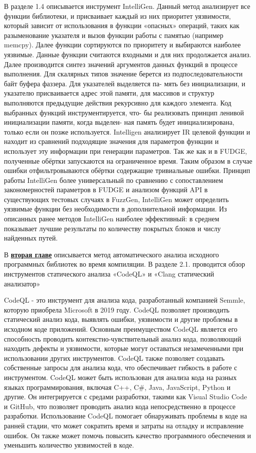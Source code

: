 В разделе 1.4 описывается инструмент IntelliGen. Данный метод анализирует все функции библиотеки, и присваивает каждый из них приоритет уязвимости, который зависит от использования в функции «опасных» операций, таких как разыменование указателя и вызов функции работы с памятью (например memcpy). Далее функции сортируются по приоритету и выбираются наиболее уязвимые. Данные функции считаются входными и для них продолжается анализ. Далее производится синтез значений аргументов данных функций в процессе выполнения. Для скалярных типов значение берется из подпоследовательности байт буфера фаззера. Для указателей выделяется па- мять без инициализации, и указателю присваивается адрес этой памяти, для массивов и структур выполняются предыдущие действия рекурсивно для каждого элемента. Код выбранных функций инструментируется, что- бы реализовать принцип ленивой инициализации памяти, когда выделен- ная память будет инициализирована, только если он позже используется. Intelligen анализирует IR целевой функции и находит из сравнений подходящие значения для параметров функции и использует эту информации при генерации параметров. Так же как и в FUDGE, полученные обёртки запускаются на ограниченное время. Таким образом в случае ошибки отфильтровываются обёртки содержащие тривиальные ошибки.
Принцип работы IntelliGen более универсальный по сравнению с сопоставлением закономерностей параметров в FUDGE и анализом функций API в существующих тестовых случаях в FuzzGen, IntelliGen может определить уязвимые функции без необходимости в дополнительной информации. Из описанных ранее методов IntelliGen наиболее эффективный: в среднем показывает лучшие результаты по количеству покрытых блоков и числу найденных путей.

В \underline{\textbf{вторая главе}} описывается метод автоматического анализа исходного программных библиотек во время компиляции. 
В разделе 2.1. проводится обзор инструментов статического анализа «CodeQL» и «Clang статический анализатор»

CodeQL - это инструмент для анализа кода, разработанный компанией Semmle, которую приобрела Microsoft в 2019 году. CodeQL позволяет производить статический анализ кода, выявлять ошибки, уязвимости и другие проблемы в исходном коде приложений. Основным преимуществом CodeQL является его способность проводить контекстно-чувствительный анализ кода, позволяющий находить дефекты и уязвимости, которые могут оставаться незамеченными при использовании других инструментов. CodeQL также позволяет создавать собственные запросы для анализа кода, что обеспечивает гибкость в работе с инструментом.
CodeQL может быть использован для анализа кода на разных языках программирования, включая C++, C\#, Java, JavaScript, Python и другие. Он интегрируется с средами разработки, такими как Visual Studio Code и GitHub, что позволяет проводить анализ кода непосредственно в процессе разработки. Использование CodeQL помогает обнаруживать проблемы в коде на ранней стадии, что может сократить время и затраты на отладку и исправление ошибок. Он также может помочь повысить качество программного обеспечения и уменьшить количество уязвимостей в коде.

